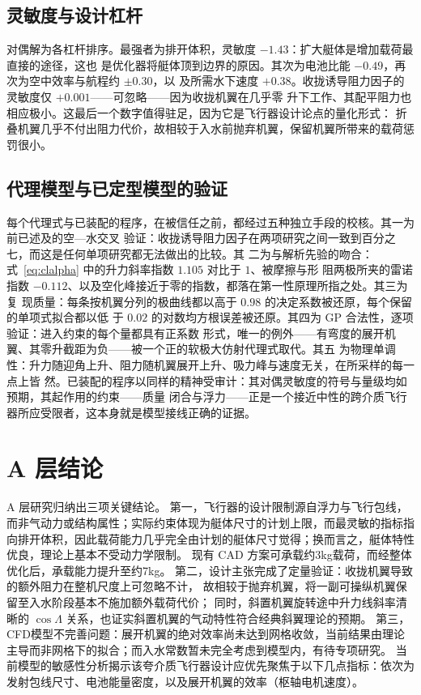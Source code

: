 \documentclass[a4paper,10pt,twocolumn]{ctexart}
\begin{document}
\subsection{灵敏度与设计杠杆}
对偶解为各杠杆排序。最强者为排开体积，灵敏度 $-1.43$：扩大艇体是增加载荷最直接的途径，这也
是优化器将艇体顶到边界的原因。其次为电池比能 $-0.49$，再次为空中效率与航程约 $\pm0.30$，以
及所需水下速度 $+0.38$。收拢诱导阻力因子的灵敏度仅 $+0.001$——可忽略——因为收拢机翼在几乎零
升下工作、其配平阻力也相应极小。这最后一个数字值得驻足，因为它是飞行器设计论点的量化形式：
折叠机翼几乎不付出阻力代价，故相较于入水前抛弃机翼，保留机翼所带来的载荷惩罚很小。

\subsection{代理模型与已定型模型的验证}
每个代理式与已装配的程序，在被信任之前，都经过五种独立手段的校核。其一为前已述及的空—水交叉
验证：收拢诱导阻力因子在两项研究之间一致到百分之七，而这是任何单项研究都无法做出的比较。其
二为与解析先验的吻合：式~\eqref{eq:clalpha} 中的升力斜率指数 $1.105$ 对比于 $1$、被摩擦与形
阻两极所夹的雷诺指数 $-0.112$、以及空化峰接近于零的指数，都落在第一性原理所指之处。其三为复
现质量：每条按机翼分列的极曲线都以高于 $0.98$ 的决定系数被还原，每个保留的单项式拟合都以低
于 $0.02$ 的对数均方根误差被还原。其四为 GP 合法性，逐项验证：进入约束的每个量都具有正系数
形式，唯一的例外——有弯度的展开机翼、其零升截距为负——被一个正的软极大仿射代理式取代。其五
为物理单调性：升力随迎角上升、阻力随机翼展开上升、吸力峰与速度无关，在所采样的每一点上皆
然。已装配的程序以同样的精神受审计：其对偶灵敏度的符号与量级均如预期，其起作用的约束——质量
闭合与浮力——正是一个接近中性的跨介质飞行器所应受限者，这本身就是模型接线正确的证据。

\section{A 层结论}

A 层研究归纳出三项关键结论。
第一，飞行器的设计限制源自浮力与飞行包线，而非气动力或结构属性；实际约束体现为艇体尺寸的计划上限，而最灵敏的指标指向排开体积，因此载荷能力几乎完全由计划的艇体尺寸觉得；换而言之，艇体特性优良，理论上基本不受动力学限制。
现有 CAD 方案可承载约3kg载荷，而经整体优化后，承载能力提升至约7kg。
第二，设计主张完成了定量验证：收拢机翼导致的额外阻力在整机尺度上可忽略不计，
故相较于抛弃机翼，将一副可操纵机翼保留至入水阶段基本不施加额外载荷代价；
同时，斜置机翼旋转途中升力线斜率清晰的 $\cos\Lambda$ 关系，也证实斜置机翼的气动特性符合经典斜翼理论的预期。
第三，CFD模型不完善问题：展开机翼的绝对效率尚未达到网格收敛，当前结果由理论主导而非网格下的拟合；而入水常数暂未完全考虑到模型内，有待专项研究。
当前模型的敏感性分析揭示该夸介质飞行器设计应优先聚焦于以下几点指标：依次为发射包线尺寸、电池能量密度，以及展开机翼的效率（枢轴电机速度）。


\end{document}
